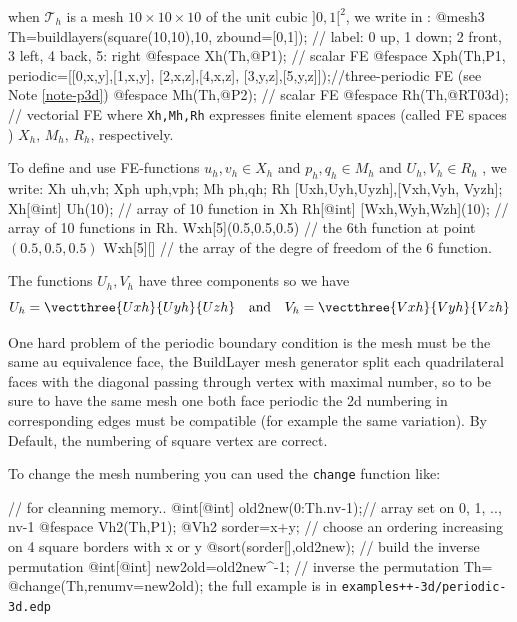 \documentclass[a4paper,twoside,12pt]{book}
\begin{document}
when $\mathcal{T}_h$ is a mesh $10\times 10\times 10$ of the unit cubic  $]0,1[^2$,
we write in \freefempp :
\bFF
@mesh3 Th=buildlayers(square(10,10),10, zbound=[0,1]);
// label:  0 up, 1 down; 2 front, 3 left, 4 back, 5: right
@fespace Xh(Th,@P1);      //  scalar FE
@fespace Xph(Th,P1,
         periodic=[[0,x,y],[1,x,y],
                   [2,x,z],[4,x,z],
                   [3,y,z],[5,y,z]]);//three-periodic FE (see Note \ref{note-p3d})
@fespace Mh(Th,@P2);      //  scalar FE
@fespace Rh(Th,@RT03d);     //  vectorial FE
\eFF
where \texttt{Xh,Mh,Rh} expresses finite element spaces (called FE spaces
) $X_h,\, M_h,\, R_h$, respectively.

To define and use FE-functions
$ u_{h},v_{h} \in X_{h} $ and $ p_{h},q_{h} \in M_{h} $
and $U_{h},V_{h} \in R_{h}$
, we write:
\bFF
  Xh uh,vh;
  Xph uph,vph;
  Mh ph,qh;
  Rh [Uxh,Uyh,Uyzh],[Vxh,Vyh, Vyzh];
  Xh[@int] Uh(10); //  array of 10 function in Xh
  Rh[@int] [Wxh,Wyh,Wzh](10); //  array of 10 functions in Rh.
  Wxh[5](0.5,0.5,0.5)  // the 6th  function at point $(0.5,0.5,0.5)$
  Wxh[5][]                                    // the array of the degre of freedom of the 6 function.
\eFF

The functions $U_{h},V_{h}$ have three components so we have
$$U_{h}=\vectthree{Uxh}{Uyh}{Uzh}  \quad \mbox{and}\quad V_{h}=\vectthree{Vxh}{Vyh}{Vzh}$$

\begin{note}\label{note-p3d} One hard  problem of the periodic boundary condition is the mesh must be the same
au equivalence face, the BuildLayer mesh generator split each  quadrilateral  faces with the diagonal
passing through vertex with maximal number, so to be sure to have the same mesh one both face periodic
the 2d numbering in corresponding edges must be compatible (for example the same variation).
By Default, the numbering of square vertex are correct. 

To change the mesh numbering you can used the \texttt{change} function like:

\bFF
{ // for cleanning  memory..
@int[@int] old2new(0:Th.nv-1);// array set on 0, 1, .., nv-1
@fespace Vh2(Th,P1);
@Vh2 sorder=x+y; // choose an ordering  increasing on 4 square borders with x or y
@sort(sorder[],old2new); // build the inverse permutation 
@int[@int]  new2old=old2new^-1;   // inverse the permutation 
Th= @change(Th,renumv=new2old);
}
\eFF
the full example is in \texttt{examples++-3d/periodic-3d.edp}
\end{note}
\end{document}

